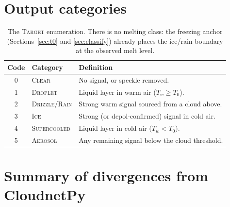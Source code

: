 \documentclass[11pt,a4paper]{article}
\newcommand{\Tzero}{\ensuremath{T_0}}
\newcommand{\target}[1]{\textsc{#1}}
\begin{document}
\section{Output categories}

\begin{table}[h]
\centering
\small
\begin{tabular}{@{}c l l@{}}
\toprule
Code & Category & Definition \\
\midrule
0 & \target{Clear}          & No signal, or speckle removed. \\
1 & \target{Droplet}        & Liquid layer in warm air ($T_w \ge \Tzero$). \\
2 & \target{Drizzle/Rain}   & Strong warm signal sourced from a cloud above. \\
3 & \target{Ice}            & Strong (or depol-confirmed) signal in cold air. \\
4 & \target{Supercooled}    & Liquid layer in cold air ($T_w < \Tzero$). \\
5 & \target{Aerosol}        & Any remaining signal below the cloud threshold. \\
\bottomrule
\end{tabular}
\caption{The \target{Target} enumeration. There is no melting class: the freezing
anchor (Sections~\ref{sec:t0} and \ref{sec:classify}) already places the ice/rain
boundary at the observed melt level.}
\end{table}

\section{Summary of divergences from CloudnetPy}
\end{document}
